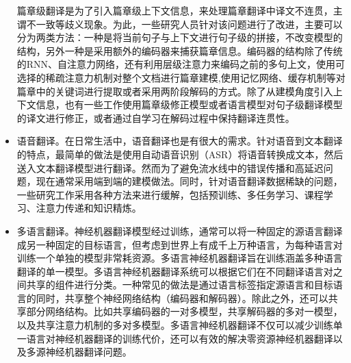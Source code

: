 \begin{itemize}
\parinterval 篇章级翻译是为了引入篇章级上下文信息，来处理篇章翻译中译文不连贯，主谓不一致等歧义现象。为此，一些研究人员针对该问题进行了改进，主要可以分为两类方法：一种是将当前句子与上下文进行句子级的拼接，不改变模型的结构\cite{DBLP:conf/discomt/TiedemannS17}，另外一种是采用额外的编码器来捕获篇章信息\cite{DBLP:journals/corr/JeanLFC17,DBLP:journals/corr/abs-1805-10163,DBLP:conf/emnlp/ZhangLSZXZL18}。编码器的结构除了传统的RNN、自注意力网络，还有利用层级注意力来编码之前的多句上文\cite{Werlen2018DocumentLevelNM,tan-etal-2019-hierarchical}，使用可选择的稀疏注意力机制对整个文档进行篇章建模\cite{DBLP:conf/naacl/MarufMH19},使用记忆网络、缓存机制等对篇章中的关键词进行提取\cite{DBLP:conf/coling/KuangXLZ18,DBLP:journals/tacl/TuLSZ18}或者采用两阶段解码的方式\cite{DBLP:conf/aaai/XiongH0W19,DBLP:conf/acl/VoitaST19}。除了从建模角度引入上下文信息，也有一些工作使用篇章级修正模型\cite{DBLP:conf/emnlp/VoitaST19}或者语言模型\cite{DBLP:journals/corr/abs-1910-00553}对句子级翻译模型的译文进行修正，或者通过自学习在解码过程中保持翻译连贯性\cite{DBLP:journals/corr/abs-2003-05259}。
\vspace{0.5em}
\item 语音翻译。在日常生活中，语音翻译也是有很大的需求。针对语音到文本翻译的特点，最简单的做法是使用自动语音识别（ASR）将语音转换成文本，然后送入文本翻译模型进行翻译\cite{DBLP:conf/icassp/Ney99,DBLP:conf/interspeech/MatusovKN05}。然而为了避免流水线中的错误传播和高延迟问题，现在通常采用端到端的建模做法\cite{DBLP:conf/naacl/DuongACBC16,DBLP:journals/corr/BerardPSB16}。同时，针对语音翻译数据稀缺的问题，一些研究工作采用各种方法来进行缓解，包括预训练\cite{DBLP:conf/naacl/BansalKLLG19}、多任务学习\cite{Weiss2017SequencetoSequenceMC,DBLP:conf/icassp/BerardBKP18}、课程学习\cite{DBLP:conf/interspeech/KanoS017}、注意力传递\cite{DBLP:journals/tacl/SperberNNW19}和知识精炼\cite{DBLP:conf/interspeech/LiuXZHWWZ19,DBLP:conf/icassp/JiaJMWCCALW19}。
\vspace{0.5em}
\item 多语言翻译。神经机器翻译模型经过训练，通常可以将一种固定的源语言翻译成另一种固定的目标语言，但考虑到世界上有成千上万种语言，为每种语言对训练一个单独的模型非常耗资源\cite{DBLP:journals/tacl/JohnsonSLKWCTVW17}。多语言神经机器翻译旨在训练涵盖多种语言翻译的单一模型。多语言神经机器翻译系统可以根据它们在不同翻译语言对之间共享的组件进行分类。一种常见的做法是通过语言标签指定源语言和目标语言的同时，共享整个神经网络结构（编码器和解码器）\cite{DBLP:journals/corr/HaNW16,DBLP:journals/tacl/JohnsonSLKWCTVW17}。除此之外，还可以共享部分网络结构。比如共享编码器的一对多模型\cite{dong-etal-2015-multi}，共享解码器的多对一模型\cite{firat-etal-2016-zero,Zoph2016MultiSourceNT}，以及共享注意力机制的多对多模型\cite{DBLP:journals/corr/LuongLSVK15,DBLP:conf/naacl/FiratCB16}。多语言神经机器翻译不仅可以减少训练单一语言对神经机器翻译的训练代价，还可以有效的解决零资源神经机器翻译\cite{DBLP:journals/tacl/JohnsonSLKWCTVW17}以及多源神经机器翻译问题\cite{Och01statisticalmulti-source}。

\end{itemize}
